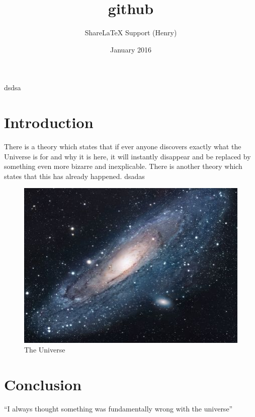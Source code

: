 \documentclass{article}
\title{github}
\author{ShareLaTeX Support (Henry) }
\date{January 2016}
\begin{document}
\maketitle
dsdsa
\section{Introduction}
There is a theory which states that if ever anyone discovers exactly what the Universe is for and why it is here, it will instantly disappear and be replaced by something even more bizarre and inexplicable.
There is another theory which states that this has already happened.
dsadas
\begin{figure}[h!]
\centering
\includegraphics[scale=1.7]{universe.jpg}
\caption{The Universe}
\label{fig:univerise}
\end{figure}

\section{Conclusion}
``I always thought something was fundamentally wrong with the universe'' \citep{adams1995hitchhiker}



\end{document}
